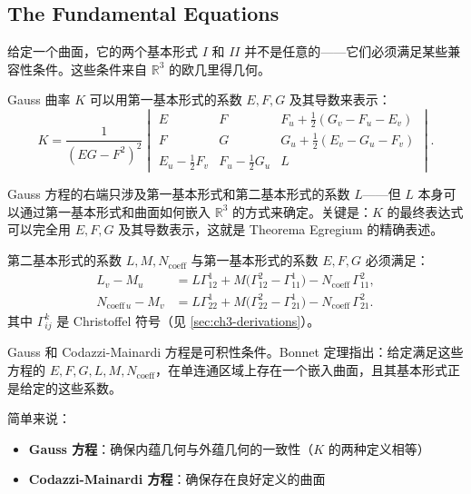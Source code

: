 \subsection{The Fundamental Equations}\label{sec:gauss-codazzi}

给定一个曲面，它的两个基本形式 $I$ 和 $II$ 并不是任意的——它们必须满足某些兼容性条件。这些条件来自 $\mathbb{R}^3$ 的欧几里得几何。

\begin{Proposition}\label{prop:gauss-equation}
Gauss 曲率 $K$ 可以用第一基本形式的系数 $E, F, G$ 及其导数来表示：
\[
K = \frac{1}{(EG-F^2)^2}\begin{vmatrix}
E & F & F_u + \frac{1}{2}(G_v - F_u - E_v) \\
F & G & G_u + \frac{1}{2}(E_v - G_u - F_v) \\
E_u - \frac{1}{2}F_v & F_u - \frac{1}{2}G_u & L
\end{vmatrix}.
\tag{3-17}\label{eq:gauss-equation}
\]
\end{Proposition}

Gauss 方程的右端只涉及第一基本形式和第二基本形式的系数 $L$——但 $L$ 本身可以通过第一基本形式和曲面如何嵌入 $\mathbb{R}^3$ 的方式来确定。关键是：$K$ 的最终表达式可以完全用 $E, F, G$ 及其导数表示，这就是 Theorema Egregium 的精确表述。

\begin{Proposition}\label{prop:codazzi-mainardi}
第二基本形式的系数 $L, M, N_{\text{coeff}}$ 与第一基本形式的系数 $E, F, G$ 必须满足：
\[
\begin{aligned}
L_v - M_u &= L\Gamma_{12}^1 + M\bigl(\Gamma_{12}^2 - \Gamma_{11}^1\bigr) - N_{\text{coeff}}\,\Gamma_{11}^2, \\
N_{\text{coeff}\,u} - M_v &= L\Gamma_{22}^1 + M\bigl(\Gamma_{22}^2 - \Gamma_{21}^1\bigr) - N_{\text{coeff}}\,\Gamma_{21}^2.
\end{aligned}
\tag{3-3-11}
\]
其中 $\Gamma_{ij}^k$ 是 Christoffel 符号（见 \cref{sec:ch3-derivations}）。
\end{Proposition}

\begin{Remark}[Bonnet 定理]
Gauss 和 Codazzi-Mainardi 方程是可积性条件。Bonnet 定理指出：给定满足这些方程的 $E, F, G, L, M, N_{\text{coeff}}$，在单连通区域上存在一个嵌入曲面，且其基本形式正是给定的这些系数。
\end{Remark}

简单来说：
\begin{itemize}
    \item \textbf{Gauss 方程}：确保内蕴几何与外蕴几何的一致性（$K$ 的两种定义相等）
    \item \textbf{Codazzi-Mainardi 方程}：确保存在良好定义的曲面
\end{itemize}

